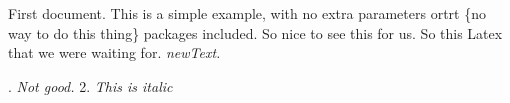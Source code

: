 \documentclass{article}
\begin{document}
First document. This is a simple example, with no 
extra parameters ortrt \{no way to do this thing\} packages included. So nice to see this for us. So this Latex that we were waiting for.
{\Large\sf\em newText.}

. {\em Not good.}
2. {\it{\em This is italic}}
\end{document}
